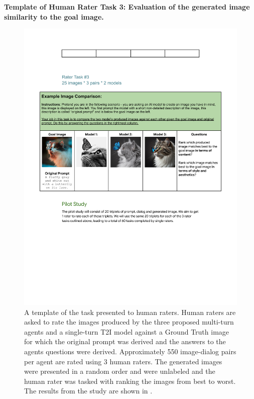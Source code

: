 \textbf{Template of Human Rater Task 3: Evaluation of the generated image similarity to the goal image.} 
\begin{figure} [H]
    \centering
    \includegraphics[width=.9\linewidth]{figures/Task_3.pdf}
    \caption{A template of the task presented to human raters. Human raters are asked to rate the images produced by the three proposed multi-turn agents and a single-turn T2I model against a Ground Truth image for which the original prompt was derived and the answers to the agents questions were derived. Approximately 550 image-dialog pairs per agent are rated using 3 human raters. The generated images were presented in a random order and were unlabeled and the human rater was tasked with ranking the images from best to worst. The results from the study are shown in .}
    \label{fig:interface-human-model-task-3}
\end{figure} 
